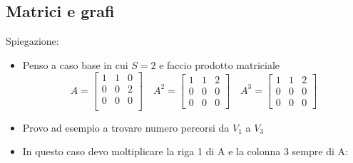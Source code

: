 \documentclass[12pt,a4paper,oneside]{article}
\begin{document}
\subsection{Matrici e grafi}
Spiegazione:
\begin{itemize}
	\item Penso a caso base in cui $S=2$ e faccio prodotto matriciale
	      \[
		      A=
		      \begin{bmatrix}
			      1 & 1 & 0 \\
			      0 & 0 & 2 \\
			      0 & 0 & 0 \\
		      \end{bmatrix}
		      \quad
		      A^{2} = \begin{bmatrix}
			      1 & 1 & 2 \\
			      0 & 0 & 0 \\
			      0 & 0 & 0
		      \end{bmatrix}
		      \quad A ^{3} =
		      \begin{bmatrix}
			      1 & 1 & 2 \\
			      0 & 0 & 0 \\
			      0 & 0 & 0
		      \end{bmatrix}
	      \]

	\item Provo ad esempio a trovare numero percorsi da $V_1$ a $V_3$
	\item In questo caso devo moltiplicare la riga 1 di A e la colonna 3 sempre di A: \[
	      \]


\end{itemize}
\end{document}
